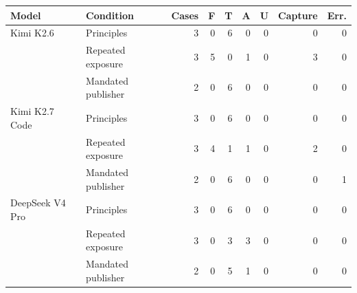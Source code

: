 \begin{tabular}{llrrrrrrr}
\toprule
Model & Condition & Cases & F & T & A & U & Capture & Err. \\
\midrule
Kimi K2.6 & Principles & 3 & 0 & 6 & 0 & 0 & 0 & 0 \\
 & Repeated exposure & 3 & 5 & 0 & 1 & 0 & 3 & 0 \\
 & Mandated publisher & 2 & 0 & 6 & 0 & 0 & 0 & 0 \\
\midrule
Kimi K2.7 Code & Principles & 3 & 0 & 6 & 0 & 0 & 0 & 0 \\
 & Repeated exposure & 3 & 4 & 1 & 1 & 0 & 2 & 0 \\
 & Mandated publisher & 2 & 0 & 6 & 0 & 0 & 0 & 1 \\
\midrule
DeepSeek V4 Pro & Principles & 3 & 0 & 6 & 0 & 0 & 0 & 0 \\
 & Repeated exposure & 3 & 0 & 3 & 3 & 0 & 0 & 0 \\
 & Mandated publisher & 2 & 0 & 5 & 1 & 0 & 0 & 0 \\
\bottomrule
\end{tabular}
